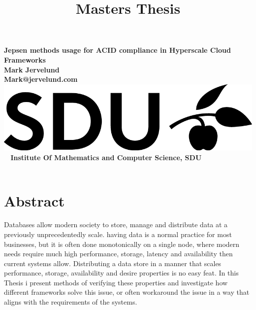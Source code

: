 \documentclass[a4paper,10pt,titlepage]{report}
\date{}
\title{Masters Thesis}
\begin{document}
\begin{titlepage}
\centering
    \vspace*{9\baselineskip}
    \huge
    \bfseries
    Jepsen methods usage for ACID compliance in Hyperscale Cloud Frameworks \\
    \normalfont
    Mark Jervelund \\
    Mark@jervelund.com \\
    \vspace*{9\baselineskip}
    \normalfont
	\includegraphics[scale=1]{logos/SDU_BLACK.png}
    \vfill\
    \vspace{5mm}
    Institute Of Mathematics and Computer Science, SDU \\

    \textbf{\datedate} \\[2\baselineskip]
\end{titlepage}

\renewcommand{\thepage}{\roman{page}}%
\tableofcontents
\newpage
\setcounter{page}{1}
\renewcommand{\thepage}{\arabic{page}}


\section*{Abstract}

Databases allow modern society to store, manage and distribute data at a previously unprecedentedly scale. having data is a normal practice for most businesses, but it is often done monotonically on a single node, where modern needs require much high performance, storage, latency and  availability then current systems allow. Distributing a data store in a manner that scales performance, storage, availability and desire properties is no easy feat. In this Thesis i present methods of verifying these properties and investigate how different frameworks solve this issue, or often workaround the issue in a way that aligns with the requirements of the systems. \\
\vspace{5mm}
\end{document}
